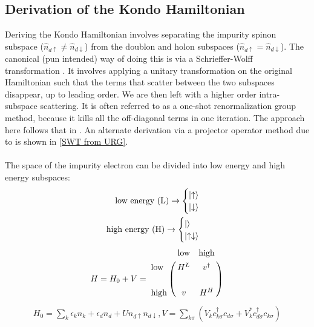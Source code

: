 \documentclass[twoside]{report}
\numberwithin{equation}{section}
\begin{document}
\subsection{Derivation of the Kondo Hamiltonian}
Deriving the Kondo Hamiltonian involves separating the impurity spinon subspace (\(\hat n_{d\uparrow} \neq \hat n_{d\downarrow}\)) from the doublon and holon subspaces (\(\hat n_{d\uparrow} = \hat n_{d\downarrow}\)). The canonical (pun intended) way of doing this is via a Schrieffer-Wolff transformation \cite{Schrieffer_Wolff}. It involves applying a unitary transformation on the original Hamiltonian such that the terms that scatter between the two subspaces disappear, up to leading order. We are then left with a higher order intra-subspace scattering. It is often referred to as a one-shot renormalization group method, because it kills all the off-diagonal terms in one iteration. The approach here follows that in \cite{piers}. An alternate derivation via a projector operator method due to \cite{hewson} is shown in \ref{SWT from URG}.
\\\\The space of the impurity electron can be divided into low energy and high energy subspaces:
\begin{equation}\begin{aligned}
\text{low energy (L)} \rightarrow \begin{cases} \ket{\uparrow} \\ \ket{\downarrow} \end{cases}\\
\text{high energy (H)} \rightarrow \begin{cases} \ket{} \\ \ket{\uparrow\downarrow} \end{cases}\\
\end{aligned}\end{equation}
\begin{equation}\begin{aligned}
H = H_0 + V = \bordermatrix{~ & \text{low} & \text{high} \cr 
\text{low} & H^L & v^\dagger \cr
       &&\cr
\text{high} & v & H^H }
\end{aligned}\end{equation}
\begin{equation}\begin{aligned}
	H_0 = \sum_{k}\epsilon_k n_{k}+ \epsilon_d n_d + U n_{d\uparrow}n_{d\downarrow}, V=\sum_{k\sigma}\left(V_k c^\dagger_{k\sigma}c_{d\sigma} +V_k^* c^\dagger_{d\sigma}c_{k\sigma}\right)
\end{aligned}\end{equation}
\end{document}
